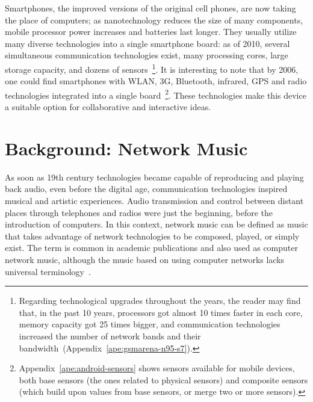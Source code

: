 Smartphones, the improved versions of the original cell phones, are now taking the place of computers; as nanotechnology reduces the size of many components, mobile processor power increases and batteries last longer. 
They usually utilize many diverse technologies into a single smartphone board: as of 2010, several simultaneous communication technologies exist, many processing cores, large storage capacity, and dozens of sensors~\footnote{
	Regarding technological upgrades throughout the years, the reader may find that, in the past 10 years, processors got almost 10 times faster in each core, memory capacity got 25 times bigger, and communication technologies increased the number of network bands and their bandwidth~(Appendix~\ref{ape:gsmarena-n95-s7}).}.
It is interesting to note that by 2006, one could find smartphones with WLAN, 3G, Bluetooth, infrared, GPS and radio technologies integrated into a single board~\footnote{
	Appendix~\ref{ape:android-sensors} shows sensors available for mobile devices, both base sensors (the ones related to physical sensors) and composite sensors (which build upon values from base sensors, or merge two or more sensors).}.
These technologies make this device a suitable option for collaborative and interactive ideas.

\section{Background: Network Music}
\label{sec:networkmusic}

As soon as 19th century technologies became capable of reproducing and playing back audio, even before the digital age, communication technologies inspired musical and artistic experiences.
Audio transmission and control between distant places through telephones and radios were just the beginning, before the introduction of computers.
In this context, network music can be defined as music that takes advantage of network technologies to be composed, played, or simply exist.
The term is common in academic publications and also used as computer network music, although the music based on using computer networks lacks universal terminology~\citep{Akkermann2014computer}.

